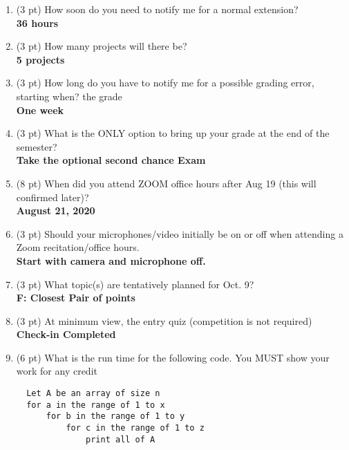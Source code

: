 \documentclass[8pt, a4paper]{article}
\begin{document}
\begin{enumerate}

  \item (3 pt) How soon do you need to notify me for a normal extension? \\
    \textbf{36 hours}

  \item (3 pt) How many projects will there be? \\
    \textbf{5 projects}

  \item (3 pt) How long do you have to notify me for a possible grading error, starting when? the grade \\
    \textbf{One week}

  \item (3 pt) What is the ONLY option to bring up your grade at the end of the semester? \\
    \textbf{Take the optional second chance Exam}

  \item (8 pt) When did you attend ZOOM office hours after Aug 19 (this will confirmed later)? \\
    \textbf{August 21, 2020  }

  \item (3 pt) Should your microphones/video initially be on or off when attending a Zoom recitation/office hours. \\
    \textbf{Start with camera and microphone off.}

  \item (3 pt) What topic(s) are tentatively planned for Oct. 9? \\
    \textbf{F: Closest Pair of points}

  \item (3 pt) At minimum view, the entry quiz (competition is not required) \\
    \textbf{Check-in Completed}

  \item (6 pt) What is the run time for the following code. You MUST show your work for any credit \\ 

  \begin{lstlisting}
  Let A be an array of size n
  for a in the range of 1 to x
      for b in the range of 1 to y
          for c in the range of 1 to z
              print all of A
  \end{lstlisting}


\end{enumerate}
\end{document}
